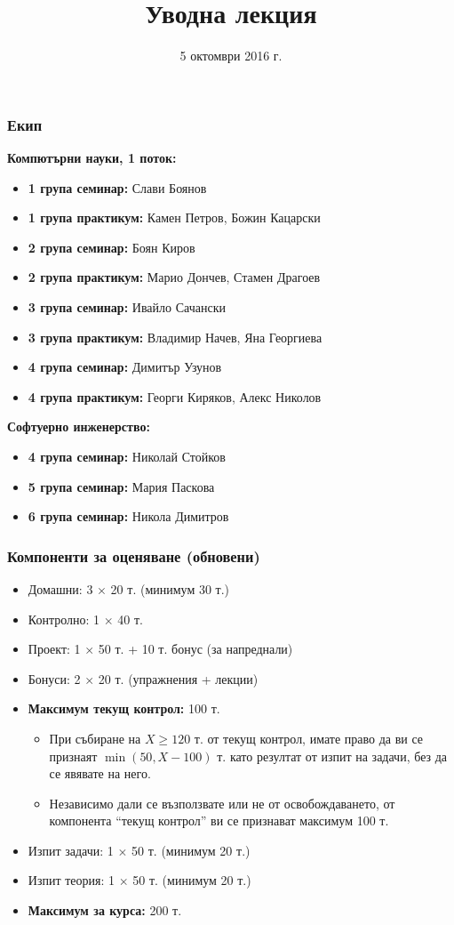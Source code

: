 \documentclass{beamer}
\title{Уводна лекция}
\date{5 октомври 2016 г.}
\begin{document}
\begin{frame}
  \titlepage
\end{frame}

\begin{frame}
  \frametitle{Екип}

  \textbf{Компютърни науки, 1 поток:}
  \begin{itemize}
  \item \textbf{1 група семинар:} Слави Боянов
  \item \textbf{1 група практикум:} Камен Петров, Божин Кацарски
  \item \textbf{2 група семинар:} Боян Киров
  \item \textbf{2 група практикум:} Марио Дончев, Стамен Драгоев
  \item \textbf{3 група семинар:} Ивайло Сачански
  \item \textbf{3 група практикум:} Владимир Начев, Яна Георгиева
  \item \textbf{4 група семинар:} Димитър Узунов
  \item \textbf{4 група практикум:} Георги Киряков, Алекс Николов
  \end{itemize}
  \textbf{Софтуерно инженерство:}
  \begin{itemize}
  \item \textbf{4 група семинар:} Николай Стойков
  \item \textbf{5 група семинар:} Мария Паскова
  \item \textbf{6 група семинар:} Никола Димитров
  \end{itemize}
\end{frame}

\begin{frame}
  \frametitle{Компоненти за оценяване (обновени)}
  
  \begin{itemize}
  \item Домашни: 3 $\times$ 20 т. \alert{(минимум 30 т.)}
  \item Контролно: 1 $\times$ 40 т.
  \item Проект: 1 $\times$ 50 т. + 10 т. бонус (за напреднали)
  \item Бонуси: 2 $\times$ 20 т. (упражнения + лекции)
  \item \textbf{Максимум текущ контрол:} 100 т.
    \begin{itemize}
    \item При събиране на $X \geq 120$ т. от текущ контрол, имате право да ви се признаят $\min(50, X - 100)$ т. като резултат от изпит на задачи, без да се явявате на него.
    \item Независимо дали се възползвате или не от освобождаването, от компонента ``текущ контрол'' ви се признават максимум 100 т.
    \end{itemize}
  \item Изпит задачи: 1 $\times$ 50 т. \alert{(минимум 20 т.)}
  \item Изпит теория: 1 $\times$ 50 т. \alert{(минимум 20 т.)}
  \item \textbf{Максимум за курса:} 200 т.
  \end{itemize}
\end{frame}
\end{document}
